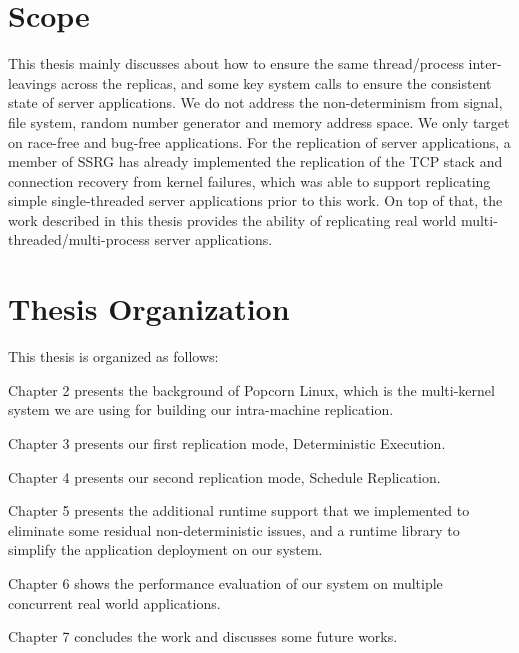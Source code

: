 \section{Scope}
This thesis mainly discusses about how to ensure the same thread/process inter-leavings across the replicas, and some key system calls to ensure the consistent state of server applications. We do not address the non-determinism from signal, file system, random number generator and memory address space. We only target on race-free and bug-free applications. For the replication of server applications, a member of SSRG has already implemented the replication of the TCP stack and connection recovery from kernel failures, which was able to support replicating simple single-threaded server applications prior to this work. On top of that, the work described in this thesis provides the ability of replicating real world multi-threaded/multi-process server applications.

\section{Thesis Organization}
This thesis is organized as follows:

Chapter 2 presents the background of Popcorn Linux, which is the multi-kernel system we are using for building our intra-machine replication.

Chapter 3 presents our first replication mode, Deterministic Execution. 

Chapter 4 presents our second replication mode, Schedule Replication.

Chapter 5 presents the additional runtime support that we implemented to eliminate some residual non-deterministic issues, and a runtime library to simplify the application deployment on our system.

Chapter 6 shows the performance evaluation of our system on multiple concurrent real world applications.

Chapter 7 concludes the work and discusses some future works.